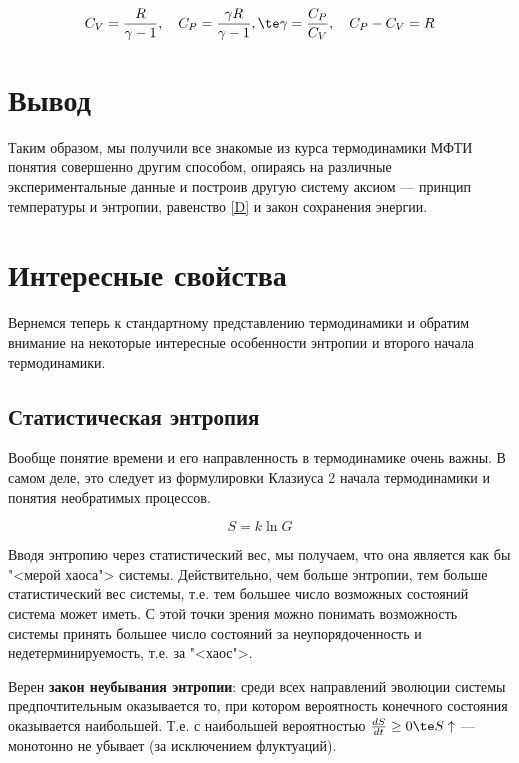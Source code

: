 \documentclass[12pt]{kiarticle}
\begin{document}
\begin{equation}\label{}
C_V = \dfrac{R}{\gamma - 1},  \quad C_P = \dfrac{\gamma R}{\gamma - 1}, \te \gamma = \dfrac{C_P}{C_V}, \quad C_P - C_V = R
\end{equation}


\section{Вывод}

Таким образом, мы получили все знакомые из курса термодинамики МФТИ понятия совершенно другим способом, опираясь на различные экспериментальные данные и построив другую систему аксиом --- принцип температуры и энтропии, равенство \eqref{D} и  закон сохранения энергии.







\newpage %
\section{Интересные свойства}

Вернемся теперь к стандартному представлению термодинамики и обратим внимание на некоторые интересные особенности энтропии и второго начала термодинамики.

\subsection{Статистическая энтропия}

Вообще понятие времени и его направленность в термодинамике очень важны. В самом деле, это следует из формулировки Клазиуса 2 начала термодинамики и понятия необратимых процессов.
 
 \begin{equation}\label{}
 S = k \ln G
 \end{equation}
 
 Вводя энтропию через статистический вес, мы получаем, что она является как бы "<мерой хаоса"> системы. Действительно, чем больше энтропии, тем больше статистический вес системы, т.е. тем большее число возможных состояний система может иметь. С этой точки зрения можно понимать возможность системы принять большее число состояний за неупорядоченность и недетерминируемость, т.е. за "<хаос">.

Верен \textbf{закон неубывания энтропии}: среди всех направлений эволюции системы предпочтительным оказывается то, при котором вероятность конечного состояния оказывается наибольшей. Т.е. с наибольшей вероятностью $ \frac{dS}{dt} \geq 0 \te S\uparrow $ --- монотонно не убывает (за исключением флуктуаций).
\end{document}
